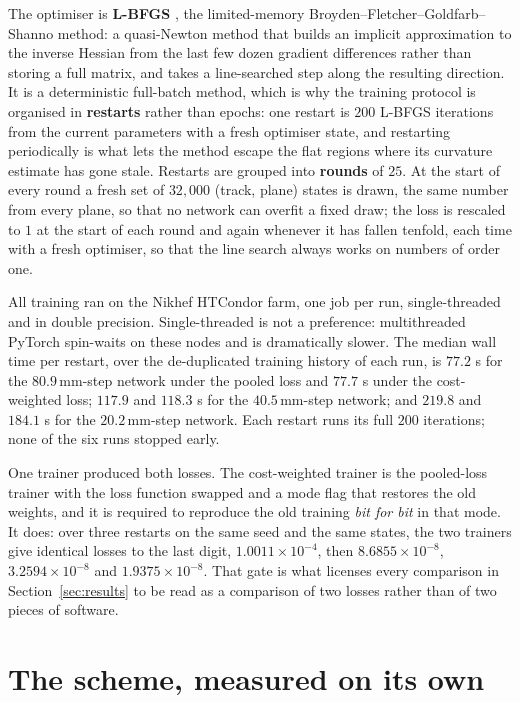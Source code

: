 \documentclass[11pt,a4paper]{article}
\newcommand{\mm}{\ensuremath{\,\mathrm{mm}}}
\begin{document}
The optimiser is \textbf{L-BFGS} \citep{liu1989}, the limited-memory
Broyden--Fletcher--Goldfarb--Shanno method: a quasi-Newton method that builds an
implicit approximation to the inverse Hessian from the last few dozen gradient
differences rather than storing a full matrix, and takes a line-searched step
along the resulting direction. It is a deterministic full-batch method, which is
why the training protocol is organised in \textbf{restarts} rather than epochs:
one restart is $200$ L-BFGS iterations from the current parameters with a fresh
optimiser state, and restarting periodically is what lets the method escape the
flat regions where its curvature estimate has gone stale. Restarts are grouped
into \textbf{rounds} of $25$. At the start of every round a fresh set of
$32{,}000$ (track, plane) states is drawn, the same number from every plane, so
that no network can overfit a fixed draw; the loss is rescaled to $1$ at the
start of each round and again whenever it has fallen tenfold, each time with a
fresh optimiser, so that the line search always works on numbers of order one.

All training ran on the Nikhef HTCondor farm, one job per run, single-threaded
and in double precision. Single-threaded is not a preference: multithreaded
PyTorch spin-waits on these nodes and is dramatically slower. The median wall
time per restart, over the de-duplicated training history of each run, is
$77.2$ s for the $80.9\mm$-step network under the pooled loss and $77.7$ s under
the cost-weighted loss; $117.9$ and $118.3$ s for the $40.5\mm$-step network;
and $219.8$ and $184.1$ s for the $20.2\mm$-step network. Each restart runs its
full $200$ iterations; none of the six runs stopped early.

One trainer produced both losses. The cost-weighted trainer is the pooled-loss
trainer with the loss function swapped and a mode flag that restores the old
weights, and it is required to reproduce the old training \emph{bit for bit} in
that mode. It does: over three restarts on the same seed and the same states,
the two trainers give identical losses to the last digit, $1.0011 \times
10^{-4}$, then $8.6855 \times 10^{-8}$, $3.2594 \times 10^{-8}$ and
$1.9375 \times 10^{-8}$. That gate is what licenses every comparison in
Section~\ref{sec:results} to be read as a comparison of two losses rather than
of two pieces of software.

\section{The scheme, measured on its own}
\label{sec:scheme}
\end{document}
